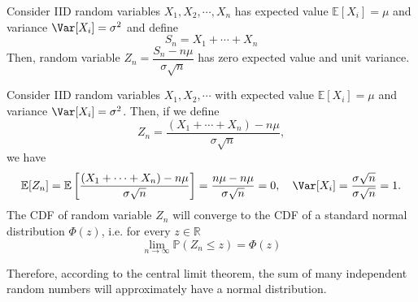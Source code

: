 Consider IID random variables \(X_1, X_2, \cdots, X_n\) has expected value \(\mathbb{E}[X_i] = \mu\) and variance \(\Var[X_i] = \sigma^2\) and define
\[
    S_n = X_1 + \cdots + X_n
\]
Then, random variable \(Z_n = \dfrac{S_n - n\mu}{\sigma\sqrt{n}}\) has zero expected value and unit variance. 

\begin{theorem}
    Consider IID random variables \(X_1, X_2, \cdots\) with expected value \(\mathbb{E}[X_i] = \mu\) and variance \(\Var[X_i] = \sigma^2\). Then, if we define
    \[
        Z_n = \dfrac{(X_1 + \cdots + X_n) - n\mu}{\sigma\sqrt{n}},
    \]
    we have 
    \[
        \mathbb{E}[Z_n] = \mathbb{E}\left[\dfrac{(X_1 + \cdots + X_n) - n\mu}{\sigma\sqrt{n}}\right] = \dfrac{n\mu - n\mu}{\sigma\sqrt{n}} = 0, \quad \Var[X_i] = \dfrac{\sigma\sqrt{n}}{\sigma\sqrt{n}} = 1.
    \]
    The CDF of random variable \(Z_n\) will converge to the CDF of a standard normal distribution \(\varPhi (z)\), i.e. for every \(z \in \mathbb{R}\)
    \[
        \lim_{n \to \infty} \mathbb{P}(Z_n \leq z) = \varPhi (z)
    \]
\end{theorem}
Therefore, according to the central limit theorem, the sum of many independent random numbers will approximately have a normal distribution.

